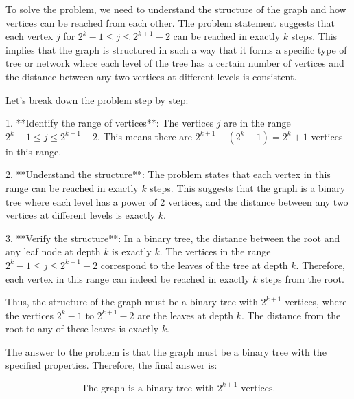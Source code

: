 To solve the problem, we need to understand the structure of the graph and how vertices can be reached from each other. The problem statement suggests that each vertex \( j \) for \( 2^k - 1 \le j \le 2^{k+1} - 2 \) can be reached in exactly \( k \) steps. This implies that the graph is structured in such a way that it forms a specific type of tree or network where each level of the tree has a certain number of vertices and the distance between any two vertices at different levels is consistent.

Let's break down the problem step by step:

1. **Identify the range of vertices**: The vertices \( j \) are in the range \( 2^k - 1 \le j \le 2^{k+1} - 2 \). This means there are \( 2^{k+1} - (2^k - 1) = 2^k + 1 \) vertices in this range.

2. **Understand the structure**: The problem states that each vertex in this range can be reached in exactly \( k \) steps. This suggests that the graph is a binary tree where each level has a power of 2 vertices, and the distance between any two vertices at different levels is exactly \( k \).

3. **Verify the structure**: In a binary tree, the distance between the root and any leaf node at depth \( k \) is exactly \( k \). The vertices in the range \( 2^k - 1 \le j \le 2^{k+1} - 2 \) correspond to the leaves of the tree at depth \( k \). Therefore, each vertex in this range can indeed be reached in exactly \( k \) steps from the root.

Thus, the structure of the graph must be a binary tree with \( 2^{k+1} \) vertices, where the vertices \( 2^k - 1 \) to \( 2^{k+1} - 2 \) are the leaves at depth \( k \). The distance from the root to any of these leaves is exactly \( k \).

The answer to the problem is that the graph must be a binary tree with the specified properties. Therefore, the final answer is:

\[
\boxed{\text{The graph is a binary tree with } 2^{k+1} \text{ vertices.}}
\]